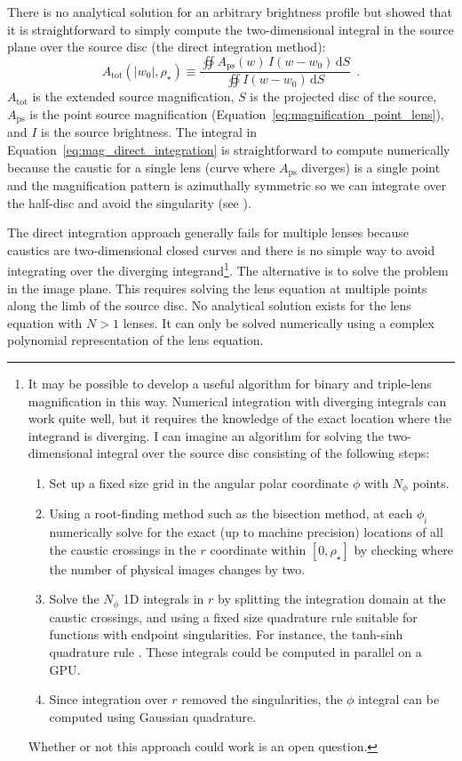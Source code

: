 \documentclass[12pt,dvipsnames]{report}
\newcommand{\ud}{\,\mathrm{d}}
\newcommand{\ssf}[1]{\textsf{#1}}
\newcommand{\hquad}{~~}
\begin{document}
There is no analytical solution for an arbitrary brightness profile but
\citet{2009ApJ...695..200L} showed that it is straightforward to simply compute
the two-dimensional integral in the source plane over the source disc (the direct integration 
method):
\begin{equation}
    A_\mathrm{tot}(|w_0|,\rho_\star)\equiv \frac{\oiint A_\mathrm{ps}(w)\,I(w - w_0)\ud S}{
        \oiint I(w - w_0)\ud S}
        \hquad.
    \label{eq:mag_direct_integration}
\end{equation}
$A_\mathrm{tot}$ is the extended source magnification, $S$ is the projected
disc of the source, $A_\mathrm{ps}$ is the point source magnification
(Equation~\ref{eq:magnification_point_lens}), and $I$ is the source brightness.
The integral in Equation~\ref{eq:mag_direct_integration} is straightforward to
compute numerically because the caustic for a single lens (curve where 
$A_\mathrm{ps}$ diverges) is a single point and the magnification pattern is 
azimuthally symmetric so we can integrate over the half-disc and avoid the 
singularity (see \citet{2009ApJ...695..200L}).

The direct integration approach generally fails for multiple lenses because caustics are 
two-dimensional closed curves and there is no simple way to avoid integrating over the 
diverging integrand\footnote{It may be possible to develop a useful algorithm for binary 
and triple-lens magnification in this way. Numerical integration with diverging integrals 
can work quite well, but it requires the knowledge of the exact location where the 
integrand is diverging. I can imagine an algorithm for solving the two-dimensional integral
over the source disc consisting of the following steps:
\begin{enumerate}
    \item Set up a fixed size grid in the angular polar coordinate $\phi$ with $N_\phi$
    points. 
    \item Using a root-finding method such as the bisection method, at each 
    $\phi_i$ numerically solve for the exact (up to machine precision) locations of all 
    the caustic crossings in the $r$ coordinate  within $[0,\rho_\star]$ by checking 
    where the number of physical images changes by two.
    \item Solve the $N_\phi$ 1D integrals in $r$ by splitting the integration domain at 
    the caustic crossings, and using a fixed size quadrature rule suitable for functions 
    with endpoint singularities. For instance, the \ssf{tanh-sinh quadrature} rule 
    \citep{2020arXiv200715057V}. These integrals could be computed in parallel on a GPU. 
    \item Since integration over $r$ removed the singularities, the $\phi$ integral  can
    be computed using Gaussian quadrature.
\end{enumerate}
Whether or not this approach could work is an open question.}. The alternative is to 
solve the  problem in the image plane. 
This requires solving the lens equation at 
multiple points  along the limb of the source disc. No analytical solution exists for 
the lens equation  with $N>1$ lenses. It can only be solved numerically using a 
complex polynomial representation of the lens equation.
\end{document}
